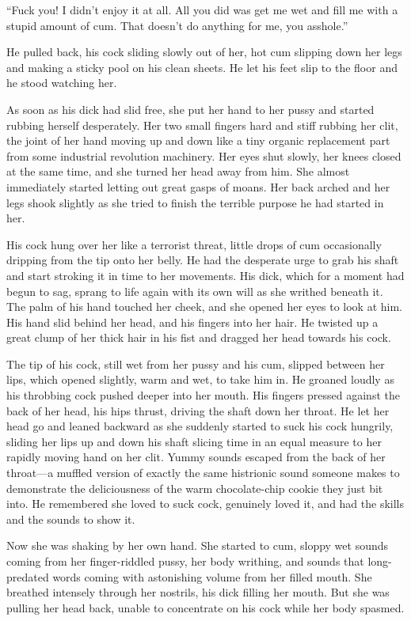 \documentclass[letterpaper]{article}
\begin{document}
``Fuck you! I didn't enjoy it at all. All you did was get me wet and fill me with a stupid amount of cum. That doesn't do anything for me, you asshole.''

He pulled back, his cock sliding slowly out of her, hot cum slipping down her legs and making a sticky pool on his clean sheets. He let his feet slip to the floor and he stood watching her.

As soon as his dick had slid free, she put her hand to her pussy and started rubbing herself desperately. 
Her two small fingers hard and stiff rubbing her clit, the joint of her hand moving up and down like a tiny organic replacement part from some industrial revolution machinery.
Her eyes shut slowly, her knees closed at the same time, and she turned her head away from him.
She almost immediately started letting out great gasps of moans.
Her back arched and her legs shook slightly as she tried to finish the terrible purpose he had started in her.

His cock hung over her like a terrorist threat, little drops of cum occasionally dripping from the tip onto her belly.
He had the desperate urge to grab his shaft and start stroking it in time to her movements.
His dick, which for a moment had begun to sag, sprang to life again with its own will as she writhed beneath it. 
The palm of his hand touched her cheek, and she opened her eyes to look at him. 
His hand slid behind her head, and his fingers into her hair. He twisted up a great clump of her thick hair in his fist and dragged her head towards his cock.

The tip of his cock, still wet from her pussy and his cum, slipped between her lips, which opened slightly, warm and wet, to take him in.
He groaned loudly as his throbbing cock pushed deeper into her mouth.
His fingers pressed against the back of her head, his hips thrust, driving the shaft down her throat.
He let her head go and leaned backward as she suddenly started to suck his cock hungrily, sliding her lips up and down his shaft slicing time in an equal measure to her rapidly moving hand on her clit.
Yummy sounds escaped from the back of her throat---a muffled version of exactly the same histrionic sound someone makes to demonstrate the deliciousness of the warm chocolate-chip cookie they just bit into.
He remembered she loved to suck cock, genuinely loved it, and had the skills and the sounds to show it.

Now she was shaking by her own hand. She started to cum, sloppy wet sounds coming from her finger-riddled pussy, her body writhing, and sounds that long-predated words coming with astonishing volume from her filled mouth.
She breathed intensely through her nostrils, his dick filling her mouth. But she was pulling her head back, unable to concentrate on his cock while her body spasmed.
\end{document}
